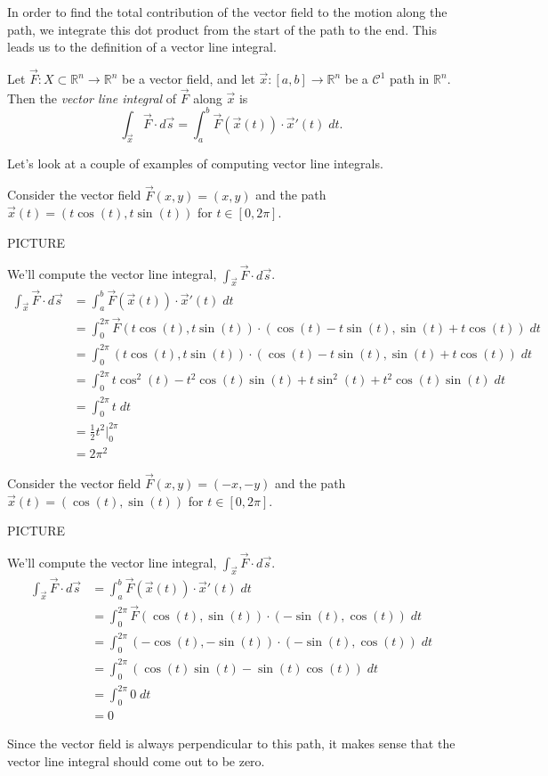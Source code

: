\documentclass{ximera}
\begin{document}
In order to find the total contribution of the vector field to the motion along the path, we integrate this dot product from the start of the path to the end. This leads us to the definition of a vector line integral.

\begin{definition}
Let $\vec{F}:X\subset\mathbb{R}^n\rightarrow\mathbb{R}^n$ be a vector field, and let $\vec{x}:[a,b]\rightarrow\mathbb{R}^n$ be a $\mathcal{C}^1$ path in $\mathbb{R}^n$. Then the \emph{vector line integral} of $\vec{F}$ along $\vec{x}$ is
\[
\int_{\vec{x}}\vec{F}\cdot d\vec{s} = \int_a^b\vec{F}(\vec{x}(t))\cdot\vec{x}'(t)\;dt.
\]
\end{definition}

Let's look at a couple of examples of computing vector line integrals.

\begin{example}
Consider the vector field $\vec{F}(x,y) = (x, y)$ and the path $\vec{x}(t) = (t\cos(t), t\sin(t))$ for $t\in [0,2\pi]$.

PICTURE

We'll compute the vector line integral, $\int_{\vec{x}}\vec{F}\cdot d\vec{s}$.
\begin{align*}
\int_{\vec{x}}\vec{F}\cdot d\vec{s} &= \int_a^b\vec{F}(\vec{x}(t))\cdot\vec{x}'(t)\;dt\\
&=\int_0^{2\pi}\vec{F}(t\cos(t),t\sin(t))\cdot (\cos(t)-t\sin(t), \sin(t)+t\cos(t))\;dt\\
&=\int_0^{2\pi}(t\cos(t),t\sin(t))\cdot (\cos(t)-t\sin(t), \sin(t)+t\cos(t))\;dt\\
&=\int_0^{2\pi}t\cos^2(t)-t^2\cos(t)\sin(t) + t\sin^2(t) + t^2\cos(t)\sin(t)\;dt\\
&=\int_0^{2\pi}t\;dt\\
&=\frac{1}{2}t^2\vert_0^{2\pi}\\
&=2\pi^2
\end{align*}
\end{example}

\begin{example}
Consider the vector field $\vec{F}(x,y) = (-x, -y)$ and the path $\vec{x}(t) = (\cos(t), \sin(t))$ for $t\in[0,2\pi]$.

PICTURE

We'll compute the vector line integral, $\int_{\vec{x}}\vec{F}\cdot d\vec{s}$.
\begin{align*}
\int_{\vec{x}}\vec{F}\cdot d\vec{s} &= \int_a^b\vec{F}(\vec{x}(t))\cdot\vec{x}'(t)\;dt\\
&=\int_0^{2\pi}\vec{F}(\cos(t), \sin(t))\cdot (-\sin(t), \cos(t))\;dt\\
&=\int_0^{2\pi}(-\cos(t), -\sin(t))\cdot (-\sin(t), \cos(t))\;dt\\
&= \int_0^{2\pi}(\cos(t)\sin(t)-\sin(t)\cos(t))\;dt\\
&= \int_0^{2\pi}0\;dt\\
&= 0
\end{align*}

Since the vector field is always perpendicular to this path, it makes sense that the vector line integral should come out to be zero.

\end{example}
\end{document}
